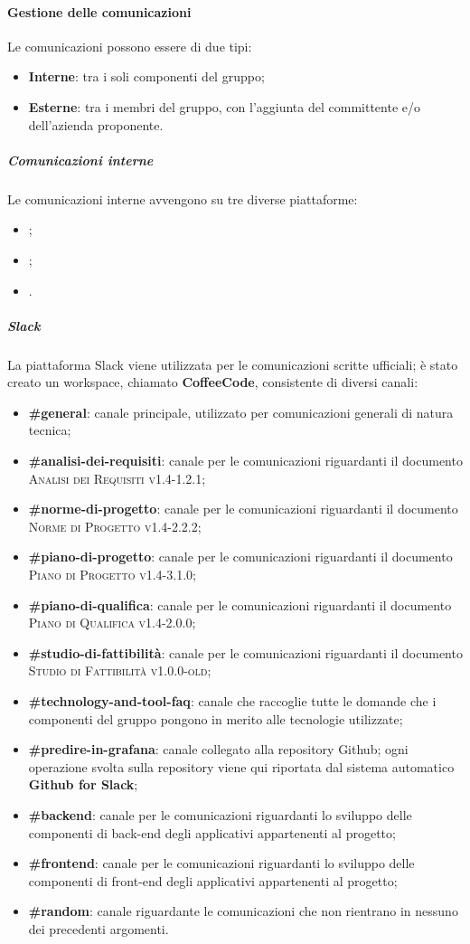 \paragraph{Gestione delle comunicazioni}
Le comunicazioni possono essere di due tipi:
\begin{itemize}
  \item \textbf{Interne}: tra i soli componenti del gruppo;
  \item \textbf{Esterne}: tra i membri del gruppo, con l'aggiunta del committente e/o dell'azienda proponente.
\end{itemize}
\subparagraph{Comunicazioni interne}
Le comunicazioni interne avvengono su tre diverse piattaforme:
\begin{itemize}
  \item {};
  \item {};
  \item {}.
\end{itemize}
\subparagraph*{Slack}
La piattaforma Slack viene utilizzata per le comunicazioni scritte ufficiali; è stato creato un workspace, chiamato \textbf{CoffeeCode}, consistente di diversi canali:
\begin{itemize}
  \item \textbf{\#general}: canale principale, utilizzato per comunicazioni generali di natura tecnica;
  \item \textbf{\#analisi-dei-requisiti}: canale per le comunicazioni riguardanti il documento \textsc{Analisi dei Requisiti v1.4-1.2.1};
  \item \textbf{\#norme-di-progetto}: canale per le comunicazioni riguardanti il documento \textsc{Norme di Progetto v1.4-2.2.2};
  \item \textbf{\#piano-di-progetto}: canale per le comunicazioni riguardanti il documento \textsc{Piano di Progetto v1.4-3.1.0};
  \item \textbf{\#piano-di-qualifica}: canale per le comunicazioni riguardanti il documento \textsc{Piano di Qualifica v1.4-2.0.0};
  \item \textbf{\#studio-di-fattibilità}: canale per le comunicazioni riguardanti il documento \textsc{Studio di Fattibilità v1.0.0-old};
  \item \textbf{\#technology-and-tool-faq}: canale che raccoglie tutte le domande che i componenti del gruppo pongono in merito alle tecnologie utilizzate;
  \item \textbf{\#predire-in-grafana}: canale collegato alla repository Github; ogni operazione svolta sulla repository viene qui riportata dal sistema automatico \textbf{Github for Slack};
  \item \textbf{\#backend}: canale per le comunicazioni riguardanti lo sviluppo delle componenti di back-end degli applicativi appartenenti al progetto;
  \item \textbf{\#frontend}: canale per le comunicazioni riguardanti lo sviluppo delle componenti di front-end degli applicativi appartenenti al progetto;
  \item \textbf{\#random}: canale riguardante le comunicazioni che non rientrano in nessuno dei precedenti argomenti.
\end{itemize}

